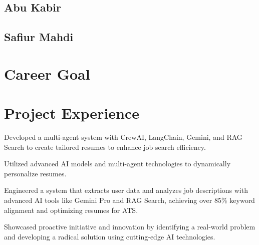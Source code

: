 \begin{minipage}[t]{0.36\textwidth}
      \subsection{Abu Kabir}
      \subsection{Safiur Mahdi}
    \sectionsep

\end{minipage} \hfill \begin{minipage}[t]{0.63\textwidth}

    \section{Career Goal} 
      \betweensummaryPointsionVSpace
    \sectionsep

  \section{Project Experience}
    
    \vspace{15pt} %
    
    \begin{tightemize}
      \item Developed a multi-agent system with CrewAI, LangChain, Gemini, and RAG Search to create tailored resumes to enhance job search efficiency.
      \item Utilized advanced AI models and multi-agent technologies to dynamically personalize resumes.
      \item Engineered a system that extracts user data and analyzes job descriptions with advanced AI tools like Gemini Pro and RAG Search, achieving over 85\% keyword alignment and optimizing resumes for ATS.
      \item Showcased proactive initiative and innovation by identifying a real-world problem and developing a radical solution using cutting-edge AI technologies.
    \end{tightemize}
  \sectionsep


\end{minipage}
